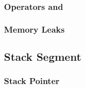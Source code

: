 \documentclass{article}
\begin{document}
\subsubsection{Operators  and }

\subsubsection{Memory Leaks}

\subsection{Stack Segment}

\subsubsection{Stack Pointer}
\end{document}
